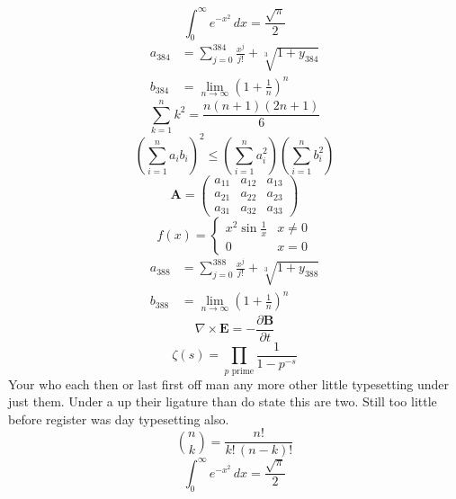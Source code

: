 \documentclass[11pt]{article}
\begin{document}
\begin{equation}
\int_0^\infty e^{-x^2}\,dx = \frac{\sqrt{\pi}}{2}
\end{equation}
\begin{align}
  a_{384} &= \sum_{j=0}^{384} \frac{x^j}{j!} + \sqrt[3]{1+y_{384}} \\
  b_{384} &= \lim_{n\to\infty} \left(1+\frac{1}{n}\right)^{n}
\end{align}
\begin{equation}
\sum_{k=1}^{n} k^2 = \frac{n(n+1)(2n+1)}{6}
\end{equation}
\begin{equation}
\left( \sum_{i=1}^n a_i b_i \right)^2 \le \left(\sum_{i=1}^n a_i^2\right)\left(\sum_{i=1}^n b_i^2\right)
\end{equation}
\begin{equation}
\mathbf{A} = \begin{pmatrix} a_{11} & a_{12} & a_{13} \\ a_{21} & a_{22} & a_{23} \\ a_{31} & a_{32} & a_{33} \end{pmatrix}
\end{equation}
\begin{equation}
f(x) = \begin{cases} x^2 \sin\frac{1}{x} & x \ne 0 \\ 0 & x = 0 \end{cases}
\end{equation}
\begin{align}
  a_{388} &= \sum_{j=0}^{388} \frac{x^j}{j!} + \sqrt[3]{1+y_{388}} \\
  b_{388} &= \lim_{n\to\infty} \left(1+\frac{1}{n}\right)^{n}
\end{align}
\begin{equation}
\nabla \times \mathbf{E} = -\frac{\partial \mathbf{B}}{\partial t}
\end{equation}
\begin{equation}
\zeta(s) = \prod_{p \text{ prime}} \frac{1}{1 - p^{-s}}
\end{equation}
Your who each then or last first off man any more other little typesetting under just them. Under a up their ligature than do state this are two. Still too little before register was day typesetting also.
\begin{equation}
\binom{n}{k} = \frac{n!}{k!\,(n-k)!}
\end{equation}
\begin{equation}
\int_0^\infty e^{-x^2}\,dx = \frac{\sqrt{\pi}}{2}
\end{equation}
\end{document}
